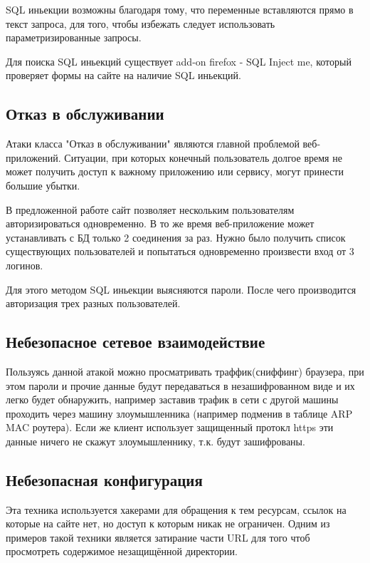 \documentclass{article}
\begin{document}
SQL иньекции возможны благодаря тому, что переменные вставляются прямо в текст запроса, для того, чтобы избежать следует использовать параметризированные запросы.

Для поиска SQL иньекций существует add-on firefox - SQL Inject me, который проверяет формы на сайте на наличие SQL иньекций.


\subsection{Отказ в обслуживании}

Атаки класса "Отказ в обслуживании" являются главной проблемой веб-приложений. Ситуации, при которых конечный пользователь
долгое время не может получить доступ к важному приложению или сервису, могут принести большие убытки.

В предложенной работе сайт позволяет нескольким пользователям авторизироваться одновременно. В то же время
веб-приложение может устанавливать с БД только 2 соединения за раз. Нужно было получить
список существующих пользователей и попытаться одновременно произвести вход от 3 логинов.

Для этого методом SQL иньекции выясняются пароли. После чего производится авторизация трех разных пользователей.


\subsection{Небезопасное сетевое взаимодействие}

Пользуясь данной атакой можно просматривать траффик(сниффинг) браузера, при этом пароли и прочие данные будут передаваться в незашифрованном виде и их легко будет обнаружить, например заставив трафик в сети с другой машины проходить через машину злоумышленника (например подменив в таблице ARP MAC роутера). Если же клиент использует защищенный протокл https эти данные ничего не скажут злоумышленнику, т.к. будут зашифрованы.


\subsection{Небезопасная конфигурация}

Эта техника используется хакерами для обращения к тем ресурсам, ссылок на которые на сайте нет, но доступ к которым никак не ограничен.
Одним из примеров такой техники является затирание части URL для того чтоб просмотреть содержимое незащищённой директории.
\end{document}
